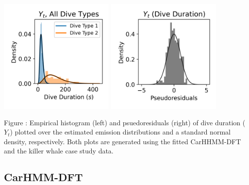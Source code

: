 \documentclass{article}
\begin{document}
        \begin{center}
        \includegraphics[width=2.25in]{../Plots/2019/20190902-182840-CATs_OB_1_0_267_CarHHMM1_empirical_hist_dive_duration.png}
        \includegraphics[width=2.25in]{../Plots/2019/20190902-182840-CATs_OB_1_0_267_CarHHMM1_pseudresids_Dive_Duration.png}
        \end{center}
        
        \noindent Figure : Empirical histogram (left) and psuedoresiduals (right) of dive duration ($Y_{t}$) plotted over the estimated emission distributions and a standard normal density, respectively. Both plots are generated using the fitted CarHHMM-DFT and the killer whale case study data.
        \addtocounter{fignum}{1}
        
        \subsection{CarHMM-DFT}
        
\end{document}
